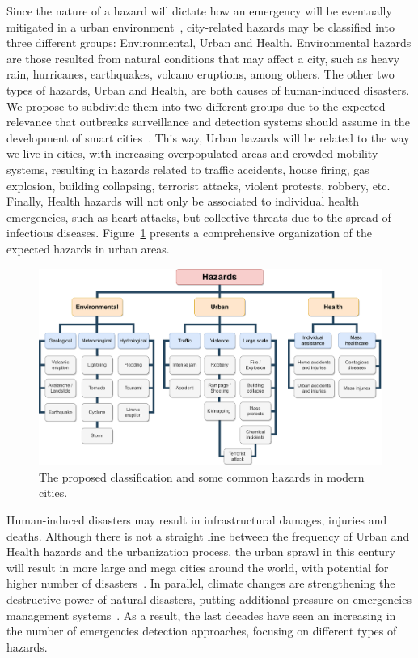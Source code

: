 \begin{refsection}
Since the nature of a hazard will dictate how an emergency will be eventually mitigated in a urban environment~\cite{citiesdisasters1,hazard2,hazard4}, city-related hazards may be classified into three different groups: Environmental, Urban and Health. Environmental hazards are those resulted from natural conditions that may affect a city, such as heavy rain, hurricanes, earthquakes, volcano eruptions, among others. The other two types of hazards, Urban and Health, are both causes of human-induced disasters. We propose to subdivide them into two different groups due to the expected relevance that outbreaks surveillance and detection systems should assume in the development of smart cities~\cite{covidsmartcities1,covidsmartcities2,enviroment3}. This way, Urban hazards will be related to the way we live in cities, with increasing overpopulated areas and crowded mobility systems, resulting in hazards related to traffic accidents, house firing, gas explosion, building collapsing, terrorist attacks, violent protests, robbery, etc. Finally, Health hazards will not only be associated to individual health emergencies, such as heart attacks, but collective threats due to the spread of infectious diseases. Figure~\ref{Fig:hazards} presents a comprehensive organization of the expected hazards in urban areas. 

\begin{figure}[htbp]
  \centering
  \includegraphics[width=\linewidth]{Chapters/2-Survey/images/Hazards.pdf}
  \caption{The proposed classification and some common hazards in modern cities.}\label{Fig:hazards}
\end{figure}

Human-induced disasters may result in infrastructural damages, injuries and deaths. Although there is not a straight line between the frequency of Urban and Health hazards and the urbanization process, the urban sprawl in this century will result in more large and mega cities around the world, with potential for higher number of disasters~\cite{urbansprawl1,urbansprawl2}. In parallel, climate changes are strengthening the destructive power of natural disasters, putting additional pressure on emergencies management systems~\cite{enviroment1,enviroment2}. As a result, the last decades have seen an increasing in the number of emergencies detection approaches, focusing on different types of hazards. 


\end{refsection}
